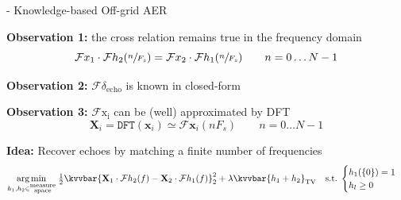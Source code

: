 \begin{frame}{\blaster - Knowledge-based Off-grid AER}
    \begin{block}{\textbf{Observation 1:} the cross relation remains true in the frequency domain}
        \begin{equation*}
            \mathcal{F}x_1 \cdot \mathcal{F}h_2 (\sfrac{n}{F_s}) = \mathcal{F}x_2 \cdot \mathcal{F}h_1(\sfrac{n}{F_s}) \qquad n=0\dots N-1
        \end{equation*}
        \end{block}

        \vspace{.5em}

        \begin{block}{\textbf{Observation 2:} $\mathcal{F}\delta_{\mathrm{echo}}$ is known in closed-form}
        \end{block}

        \vspace{1.em}
        \begin{block}{\textbf{Observation 3:} $\mathcal{F}{\mathrm{x_i}}$ can be (well) approximated by DFT}
        \begin{equation*}
            \mathbf{X}_i = \texttt{DFT}(\mathbf{x}_i) \simeq  \mathcal{F}{\mathbf{x}_i}(nF_s) \qquad n=0\dots N-1
        \end{equation*}
        \end{block}


        \vfill
        \begin{block}{\textbf{Idea:} Recover echoes by matching a finite number of frequencies}
        \begin{equation*}
            \underset{h_1,h_2 \in \substack{\text{measure} \\ \text{space}}}{\arg\min} \;
            \tfrac{1}{2} \kvvbar{
                \mathbf{X}_1 \cdot \mathcal{F}h_2 (f) - \mathbf{X}_2 \cdot \mathcal{F}h_1(f)
            }_2^2
            + \lambda \kvvbar{h_1 + h_2}_{\mathrm{TV}}
            \quad
            \text{s.t.}\;
            \begin{cases}
                h_1(\{0\})=1 \\
                h_l \geq 0
                \end{cases}
        \end{equation*}
        \end{block}


\end{frame}

